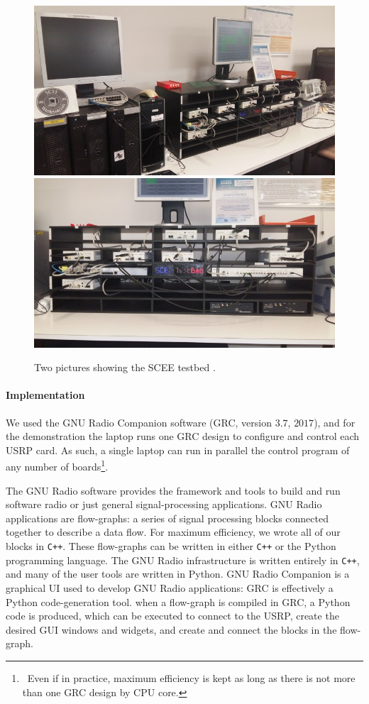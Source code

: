 \begin{figure}[!t]
    \centering
    \includegraphics[width=0.75\linewidth]{SCEE_TestBed1.jpg}
    \vspace*{20pt}
    \includegraphics[width=0.75\linewidth]{SCEE_TestBed2.jpg}
    \caption{Two pictures showing the SCEE testbed \cite[Appendix~3]{Bodinier17}.}
    \label{fig:42:photosSCEETestBed}
\end{figure}


\paragraph{Implementation}

We used the GNU Radio Companion software (GRC, version $3.7$, $2017$),
and for the demonstration the laptop runs
one GRC design to configure and control each USRP card.
As such, a single laptop can run in parallel the control program of any number of boards\footnote{~Even if in practice, maximum efficiency is kept as long as there is not more than one GRC design by CPU core.}.

The GNU Radio software provides the framework and tools to build and run software radio or just general signal-processing applications.
GNU Radio applications are flow-graphs: a series of signal processing blocks connected together to describe a data flow.
For maximum efficiency, we wrote all of our blocks in \texttt{C++}.
These flow-graphs can be written in either \texttt{C++} or the Python programming language. The GNU Radio infrastructure is written entirely in \texttt{C++}, and many of the user tools are written in Python.
GNU Radio Companion is a graphical UI used to develop GNU Radio applications:
GRC is effectively a Python code-generation tool.
when a flow-graph is compiled in GRC, a Python code is produced, which can be executed to connect to the USRP,
create the desired GUI windows and widgets, and create and connect the blocks in the flow-graph.

